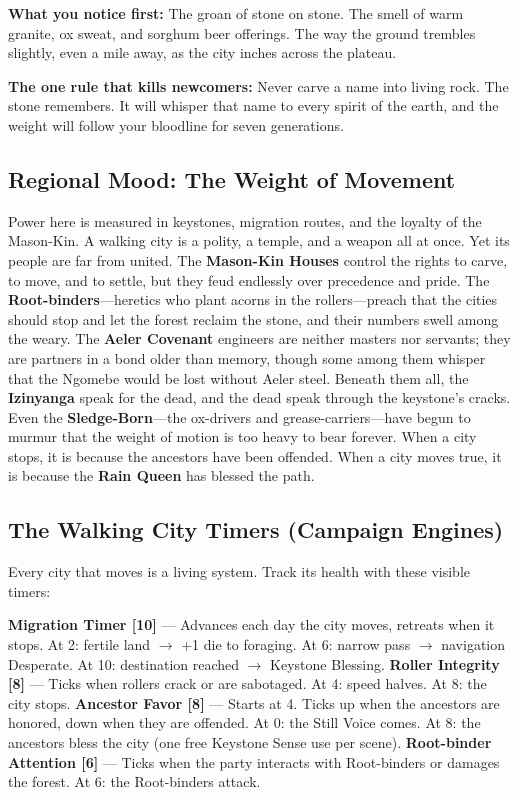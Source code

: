 \begin{tcolorbox}[colback=black!3,colframe=blue!60!black,title={Theme \& Atmosphere},breakable]
\vspace{2mm}
\textbf{What you notice first:} The groan of stone on stone. The smell of warm granite, ox sweat, and sorghum beer offerings. The way the ground trembles slightly, even a mile away, as the city inches across the plateau.

\textbf{The one rule that kills newcomers:} Never carve a name into living rock. The stone remembers. It will whisper that name to every spirit of the earth, and the weight will follow your bloodline for seven generations.
\end{tcolorbox}

\subsection*{Regional Mood: The Weight of Movement}

Power here is measured in keystones, migration routes, and the loyalty of the Mason-Kin. A walking city is a polity, a temple, and a weapon all at once. Yet its people are far from united. The \textbf{Mason-Kin Houses} control the rights to carve, to move, and to settle, but they feud endlessly over precedence and pride. The \textbf{Root-binders}---heretics who plant acorns in the rollers---preach that the cities should stop and let the forest reclaim the stone, and their numbers swell among the weary. The \textbf{Aeler Covenant} engineers are neither masters nor servants; they are partners in a bond older than memory, though some among them whisper that the Ngomebe would be lost without Aeler steel. Beneath them all, the \textbf{Izinyanga} speak for the dead, and the dead speak through the keystone's cracks. Even the \textbf{Sledge-Born}---the ox-drivers and grease-carriers---have begun to murmur that the weight of motion is too heavy to bear forever. When a city stops, it is because the ancestors have been offended. When a city moves true, it is because the \textbf{Rain Queen} has blessed the path.

\subsection*{The Walking City Timers (Campaign Engines)}
Every city that moves is a living system. Track its health with these visible timers:

\textbf{Migration Timer [10]} --- Advances each day the city moves, retreats when it stops. At 2: fertile land $\rightarrow$ +1 die to foraging. At 6: narrow pass $\rightarrow$ navigation Desperate. At 10: destination reached $\rightarrow$ Keystone Blessing.  
\textbf{Roller Integrity [8]} --- Ticks when rollers crack or are sabotaged. At 4: speed halves. At 8: the city stops.  
\textbf{Ancestor Favor [8]} --- Starts at 4. Ticks up when the ancestors are honored, down when they are offended. At 0: the Still Voice comes. At 8: the ancestors bless the city (one free Keystone Sense use per scene).  
\textbf{Root-binder Attention [6]} --- Ticks when the party interacts with Root-binders or damages the forest. At 6: the Root-binders attack.

